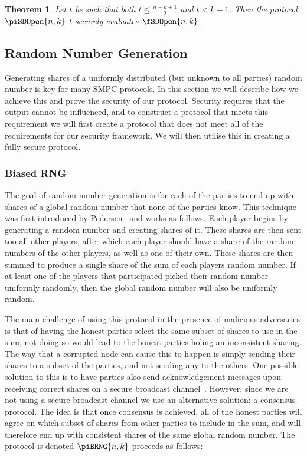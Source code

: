 \documentclass{article}
\newtheorem{theorem}{Theorem}
\theoremstyle{remark}
\begin{document}
\begin{theorem}
	Let $t$ be such that both $t \le \frac{n - k + 1}{2}$ and $t < k - 1$. Then
	the protocol $\piSDOpen{n,k}$ $t$-securely evaluates $\fSDOpen{n,k}$.
\end{theorem}

\subsection{Random Number Generation}\label{sec:rng}

Generating shares of a uniformly distributed (but unknown to all parties)
random number is key for many SMPC protocols. In this section we will describe
how we achieve this and prove the security of our protocol. Security requires
that the output cannot be influenced, and to construct a protocol that meets
this requirement we will first create a protocol that does not meet all of the
requirements for our security framework. We will then utilise this in creating
a fully secure protocol.

\subsubsection{Biased RNG}

The goal of random number generation is for each of the parties to end up with
shares of a global random number that none of the parties know. This technique
was first introduced by Pedersen~\cite{p91a} and works as follows. Each player
begins by generating a random number and creating shares of it. These shares
are then sent too all other players, after which each player should have a
share of the random numbers of the other players, as well as one of their own.
These shares are then summed to produce a single share of the sum of each
players random number. If at least one of the players that participated picked
their random number uniformly randomly, then the global random number will also
be uniformly random.

The main challenge of using this protocol in the presence of malicious
adversaries is that of having the honest parties select the same subset of
shares to use in the sum; not doing so would lead to the honest parties holing
an inconsistent sharing. The way that a corrupted node can cause this to happen
is simply sending their shares to a subset of the parties, and not sending any
to the others. One possible solution to this is to have parties also send
acknowledgement messages upon receiving correct shares on a secure broadcast
channel~\cite{gjkr96}. However, since we are not using a secure broadcast
channel we use an alternative solution: a consensus protocol. The idea is that
once consensus is achieved, all of the honest parties will agree on which
subset of shares from other parties to include in the sum, and will therefore
end up with consistent shares of the same global random number. The protocol is
denoted $\piBRNG{n,k}$ proceeds as follows:
\end{document}
